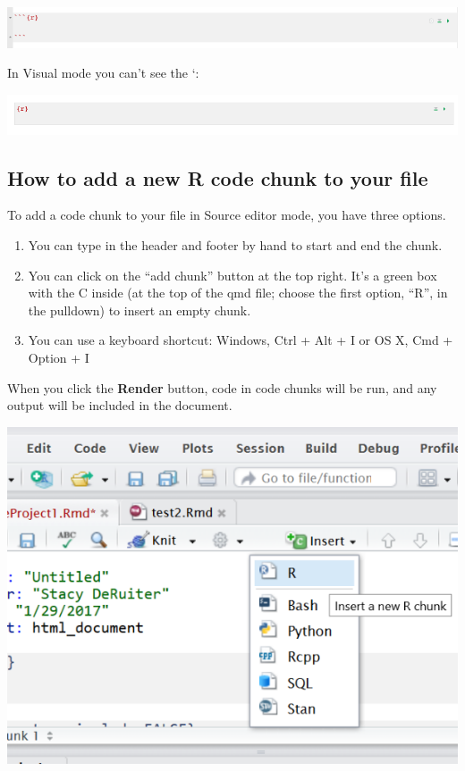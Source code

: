 \documentclass[
  letterpaper,
  DIV=11,
  numbers=noendperiod]{scrreprt}
\providecommand{\tightlist}{%
  \setlength{\itemsep}{0pt}\setlength{\parskip}{0pt}}\usepackage{longtable,booktabs,array}
\theoremstyle{remark}
\begin{document}
\begin{center}
\includegraphics[width=0.85\linewidth,height=\textheight,keepaspectratio]{images/r-chunk-source.png}
\end{center}

In Visual mode you can't see the `:

\begin{center}
\includegraphics[width=0.85\linewidth,height=\textheight,keepaspectratio]{images/r-chunk-visual.png}
\end{center}

\subsection{How to add a new R code chunk to your
file}\label{how-to-add-a-new-r-code-chunk-to-your-file}

To add a code chunk to your file in Source editor mode, you have three
options.

\begin{enumerate}
\def\labelenumi{\arabic{enumi}.}
\tightlist
\item
  You can type in the header and footer by hand to start and end the
  chunk.
\item
  You can click on the ``add chunk'' button at the top right. It's a
  green box with the C inside (at the top of the qmd file; choose the
  first option, ``R'', in the pulldown) to insert an empty chunk.
\item
  You can use a keyboard shortcut: Windows, Ctrl + Alt + I or OS X, Cmd
  + Option + I
\end{enumerate}

When you click the \textbf{Render} button, code in code chunks will be
run, and any output will be included in the document.

\begin{center}
\includegraphics[width=0.85\linewidth,height=\textheight,keepaspectratio]{images/InsertCodeChunk.png}
\end{center}
\end{document}
